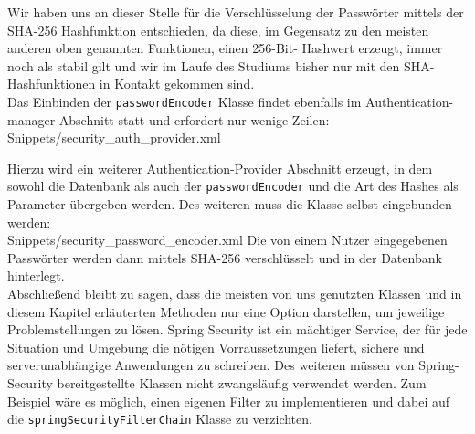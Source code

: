 Wir haben uns an dieser Stelle für die Verschlüsselung der Passwörter mittels der SHA-256 Hashfunktion 
entschieden, da diese, im Gegensatz zu den meisten anderen oben genannten Funktionen, einen 256-Bit-
Hashwert erzeugt, immer noch als stabil gilt und wir im Laufe des Studiums bisher nur mit den SHA-
Hashfunktionen in Kontakt gekommen sind. \\
Das Einbinden der \texttt{passwordEncoder} Klasse findet ebenfalls im Authentication-manager Abschnitt statt 
und erfordert nur wenige Zeilen: \\

{Snippets/security_auth_provider.xml} \newpage

Hierzu wird ein weiterer Authentication-Provider Abschnitt erzeugt, in dem sowohl die Datenbank als 
auch der \texttt{passwordEncoder} und die Art des Hashes als Parameter übergeben werden. Des weiteren muss die 
Klasse selbst eingebunden werden: \\

{Snippets/security_password_encoder.xml}
\bigskip 
Die von einem Nutzer eingegebenen Passwörter werden dann mittels SHA-256 verschlüsselt und in der 
Datenbank hinterlegt. \\
Abschließend bleibt zu sagen, dass die meisten von uns genutzten Klassen und in diesem Kapitel 
erläuterten Methoden nur eine Option darstellen, um jeweilige Problemstellungen zu lösen. Spring
Security ist ein mächtiger Service, der für jede Situation und Umgebung die nötigen Vorraussetzungen 
liefert, sichere und serverunabhängige Anwendungen zu schreiben. Des weiteren müssen von Spring-
Security bereitgestellte Klassen nicht zwangsläufig verwendet werden. Zum Beispiel wäre es möglich, 
einen eigenen Filter zu implementieren und dabei auf die \texttt{springSecurityFilterChain} Klasse zu 
verzichten.









